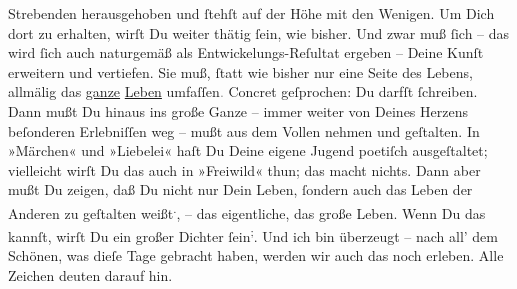\begin{ledgroupsized}[t]{13cm}
               Strebenden herausgehoben und ſtehſt auf der Höhe mit den Wenigen.\pend
           \pstart
           Um Dich dort zu erhalten, wirſt Du weiter thätig ſein, wie bisher. Und zwar muß ſich
               – das wird {\pb}ſich auch naturgemäß als
               Entwickelungs-Reſultat ergeben – Deine Kunſt erweitern und vertiefen. Sie muß, ſtatt
               wie bisher nur eine Seite des Lebens, allmälig das \uline{ganze}{ }\uline{Leben} umfaſſen\textcolor{gray}{.} Concret  geſprochen: Du darfſt \label{K_L02753-55v}\label{K_L02753-55h} ſchreiben. Dann mußt Du hinaus ins große Ganze – immer weiter von Deines
               Herzens beſonderen Erlebniſſen weg – mußt aus dem Vollen {\pb}nehmen und geſtalten. In »Märchen« und »Liebelei«
               haſt Du Deine eigene Jugend poetiſch ausgeſtaltet; vielleicht wirſt Du das auch in
                  »Freiwild« thun; das macht nichts. Dann aber
               mußt Du zeigen, daß Du nicht nur Dein Leben, ſondern auch das Leben  der Anderen zu geſtalten weißt\substVorne{}\textsuperscript{.}\substDazwischen{},\substHinten{} – das eigentliche, das große Leben. Wenn Du das kannſt, wirſt Du ein großer
               Dichter ſein\substVorne{}\textsuperscript{;}\substDazwischen{}.\substHinten{} Und ich bin überzeugt –  nach all’ dem
               Schönen, was dieſe {\pb}Tage gebracht haben, werden wir
               auch das noch  erleben. Alle Zeichen deuten darauf
               hin.\pend
           \pstart

\end{ledgroupsized}
